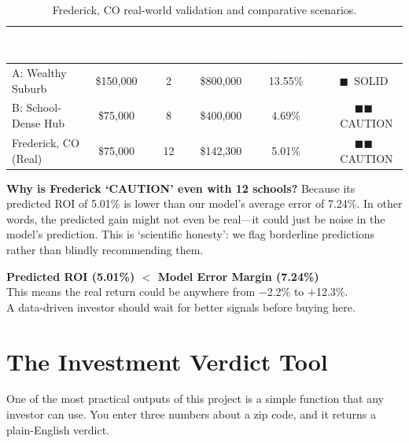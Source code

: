 \documentclass[12pt, a4paper]{article}
\newcommand{\good}{\textcolor{solidgreen}{$\blacksquare$}}
\newcommand{\caution}{\textcolor{cautionamber}{$\blacksquare\blacksquare$}}
\newcommand{\hrow}{\rowcolor{rowblue}}
\begin{document}
\begin{table}[H]
\centering
\renewcommand{\arraystretch}{1.4}
\begin{tabular}{lccccc}
\toprule
\rowcolor{headerblue}
\textcolor{white}{\textbf{Scenario}} &
\textcolor{white}{\textbf{Income}} &
\textcolor{white}{\textbf{Schools}} &
\textcolor{white}{\textbf{Price}} &
\textcolor{white}{\textbf{Predicted ROI}} &
\textcolor{white}{\textbf{Verdict}} \\
\midrule
A: Wealthy Suburb    & \$150,000 & 2  & \$800,000 & 13.55\% & \good\ SOLID \\
\hrow B: School-Dense Hub  & \$75,000  & 8  & \$400,000 & 4.69\%  & \caution\ CAUTION \\
Frederick, CO (Real) & \$75,000  & 12 & \$142,300 & 5.01\%  & \caution\ CAUTION \\
\bottomrule
\end{tabular}
\caption{Frederick, CO real-world validation and comparative scenarios.}
\end{table}

\textbf{Why is Frederick `CAUTION' even with 12 schools?} Because its predicted ROI of 5.01\% is lower than
our model's average error of 7.24\%. In other words, the predicted gain might not even be real---it could just be
noise in the model's prediction. This is `scientific honesty': we flag borderline predictions rather than blindly
recommending them.

\begin{tcolorbox}[colback=yellow!10, colframe=cautionamber, arc=4pt,
    title={\textcolor{white}{\bfseries \caution\ Frederick, CO Verdict: CAUTION}},
    coltitle=white]
\textbf{Predicted ROI (5.01\%) $<$ Model Error Margin (7.24\%)}\\[4pt]
This means the real return could be anywhere from $-$2.2\% to $+$12.3\%.\\
A data-driven investor should wait for better signals before buying here.
\end{tcolorbox}

\section{The Investment Verdict Tool}

One of the most practical outputs of this project is a simple function that any investor can use. You enter three
numbers about a zip code, and it returns a plain-English verdict.
\end{document}
